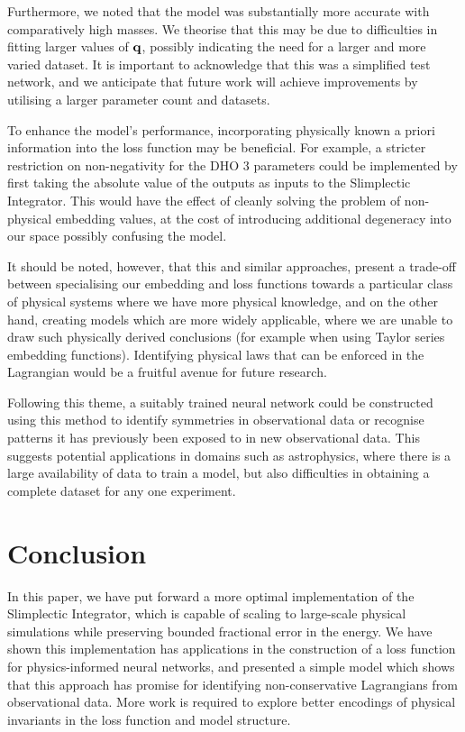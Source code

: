 Furthermore, we noted that the model was substantially more accurate with comparatively high masses. We theorise that this may be due to difficulties in fitting larger values of $\vb{q}$, possibly indicating the need for a larger and more varied dataset. It is important to acknowledge that this was a simplified test network, and we anticipate that future work will achieve improvements by utilising a larger parameter count and datasets.

To enhance the model's performance, incorporating physically known a priori information into the loss function may be beneficial. For example, a stricter restriction on non-negativity for the DHO 3 parameters could be implemented by first taking the absolute value of the outputs as inputs to the Slimplectic Integrator. This would have the effect of cleanly solving the problem of non-physical embedding values, at the cost of introducing additional degeneracy into our space possibly confusing the model.

It should be noted, however, that this and similar approaches, present a trade-off between specialising our embedding and loss functions towards a particular class of physical systems where we have more physical knowledge, and on the other hand, creating models which are more widely applicable, where we are unable to draw such physically derived conclusions (for example when using Taylor series embedding functions).
Identifying physical laws that can be enforced in the Lagrangian would be a fruitful avenue for future research.

Following this theme, a suitably trained neural network could be constructed using this method to identify symmetries in observational data or recognise patterns it has previously been exposed to in new observational data. This suggests potential applications in domains such as astrophysics, where there is a large availability of data to train a model, but also difficulties in obtaining a complete dataset for any one experiment.

\section{Conclusion}

In this paper, we have put forward a more optimal implementation of the Slimplectic Integrator, which is capable of scaling to large-scale physical simulations while preserving bounded fractional error in the energy. We have shown this implementation has applications in the construction of a loss function for physics-informed neural networks, and presented a simple model which shows that this approach has promise for identifying non-conservative Lagrangians from observational data. More work is required to explore better encodings of physical invariants in the loss function and model structure.
